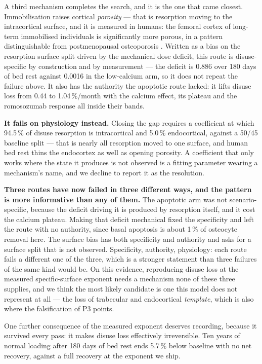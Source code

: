 \documentclass[10pt,letterpaper]{article}
\begin{document}
A third mechanism completes the search, and it is the one that came closest.
Immobilisation raises cortical \emph{porosity} --- that is resorption moving to
the intracortical surface, and it is measured in humans: the femoral cortex of
long-term immobilised individuals is significantly more porous, in a pattern
distinguishable from postmenopausal osteoporosis \cite{rolvien2020}. Written as
a bias on the resorption surface split driven by the mechanical dose deficit,
this route is disuse-specific by construction and by measurement --- the deficit
is 0.886 over 180 days of bed rest against 0.0016 in the low-calcium arm, so it
does not repeat the failure above. It also has the authority the apoptotic route
lacked: it lifts disuse loss from 0.44 to 1.04\,\%/month with the calcium
effect, its plateau and the romosozumab response all inside their bands.

\textbf{It fails on physiology instead.} Closing the gap requires a coefficient
at which 94.5\,\% of disuse resorption is intracortical and 5.0\,\%
endocortical, against a 50/45 baseline split --- that is nearly all resorption
moved to one surface, and human bed rest thins the endocortex as well as opening
porosity. A coefficient that only works where the state it produces is not
observed is a fitting parameter wearing a mechanism's name, and we decline to
report it as the resolution.

\textbf{Three routes have now failed in three different ways, and the pattern is
more informative than any of them.} The apoptotic arm was not scenario-specific,
because the deficit driving it is produced by resorption itself, and it cost the
calcium plateau. Making that deficit mechanical fixed the specificity and left
the route with no authority, since basal apoptosis is about 1\,\% of osteocyte
removal here. The surface bias has both specificity and authority and asks for a
surface split that is not observed. Specificity, authority, physiology: each
route fails a different one of the three, which is a stronger statement than
three failures of the same kind would be. On this evidence, reproducing disuse
loss at the measured specific-surface exponent needs a mechanism none of these
three supplies, and we think the most likely candidate is one this model does
not represent at all --- the loss of trabecular and endocortical \emph{template},
which is also where the falsification of P3 points.

One further consequence of the measured exponent deserves recording, because it
survived every pass: it makes disuse loss effectively irreversible. Ten years
of normal loading after 180 days of bed rest ends 5.7\,\% below baseline with no
net recovery, against a full recovery at the exponent we ship.
\end{document}
